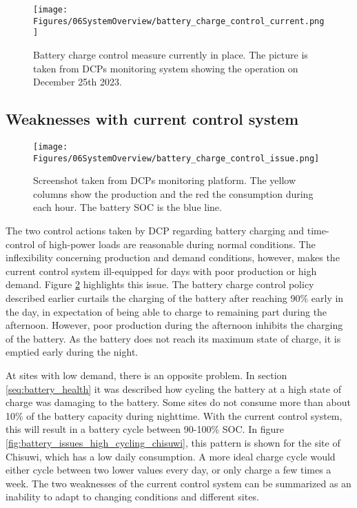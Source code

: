\begin{figure}[h]
    \centering
    \texttt{[image: Figures/06SystemOverview/battery\_charge\_control\_current.png]}
    \caption[Current Battery charge control system]{Battery charge control measure currently in place. The picture is taken from DCPs monitoring system showing the operation on December 25th 2023.}
    \label{fig:battery_charge_control_current}
\end{figure}

\subsection{Weaknesses with current control system}\label{sec:weaknesses_current_syst}

\begin{figure}[h]
    \centering
    \texttt{[image: Figures/06SystemOverview/battery\_charge\_control\_issue.png]}
    \caption[Current control system weakness 1 - Battery Depletion]{Screenshot taken from DCPs monitoring platform. The yellow columns show the production and the red the consumption during each hour. The battery SOC is the blue line.}
    \label{fig:battery_charge_control_issue}
\end{figure}

The two control actions taken by DCP regarding battery charging and time-control of high-power loads are reasonable during normal conditions. The inflexibility concerning production and demand conditions, however, makes the current control system ill-equipped for days with poor production or high demand. Figure \ref{fig:battery_charge_control_issue} highlights this issue. The battery charge control policy described earlier curtails the charging of the battery after reaching 90\% early in the day, in expectation of being able to charge to remaining part during the afternoon. However, poor production during the afternoon inhibits the charging of the battery. As the battery does not reach its maximum state of charge, it is emptied early during the night. 

At sites with low demand, there is an opposite problem. In section \ref{seq:battery_health} it was described how cycling the battery at a high state of charge was damaging to the battery. Some sites do not consume more than about 10\% of the battery capacity during nighttime. With the current control system, this will result in a battery cycle between 90-100\% SOC. In figure \ref{fig:battery_issues_high_cycling_chisuwi}, this pattern is shown for the site of Chisuwi, which has a low daily consumption. A more ideal charge cycle would either cycle between two lower values every day, or only charge a few times a week. The two weaknesses of the current control system can be summarized as an inability to adapt to changing conditions and different sites.

